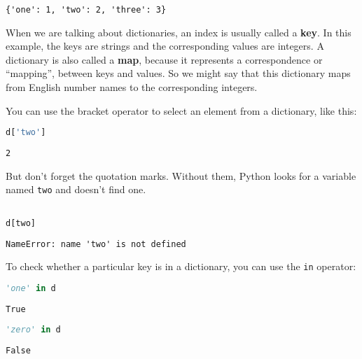 \begin{lstlisting}[style=output]
{'one': 1, 'two': 2, 'three': 3}
\end{lstlisting}

When we are talking about dictionaries, an index is usually called a
\textbf{key}. In this example, the keys are strings and the
corresponding values are integers. A dictionary is also called a
\textbf{map}, because it represents a correspondence or ``mapping'',
between keys and values. So we might say that this dictionary maps from
English number names to the corresponding integers.

You can use the bracket operator to select an element from a dictionary,
like this:

\begin{lstlisting}[language=Python,style=source]
d['two']
\end{lstlisting}

\begin{lstlisting}[style=output]
2
\end{lstlisting}

But don't forget the quotation marks. Without them, Python looks for a
variable named \passthrough{\lstinline!two!} and doesn't find one.

\begin{lstlisting}[language=Python,style=source]
%%expect NameError

d[two]
\end{lstlisting}

\begin{lstlisting}[style=output]
NameError: name 'two' is not defined
\end{lstlisting}

To check whether a particular key is in a dictionary, you can use the
\passthrough{\lstinline!in!} operator:

\begin{lstlisting}[language=Python,style=source]
'one' in d
\end{lstlisting}

\begin{lstlisting}[style=output]
True
\end{lstlisting}

\begin{lstlisting}[language=Python,style=source]
'zero' in d
\end{lstlisting}

\begin{lstlisting}[style=output]
False
\end{lstlisting}

